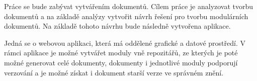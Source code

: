 Práce se bude zabývat vytvářením dokumentů. Cílem práce je analyzovat tvorbu dokumentů a na základě analýzy vytvořit návrh řešení pro tvorbu
modulárních dokumentů. Na základě tohoto návrhu bude následně vytvořena aplikace.

Jedná se o webovou aplikaci, která má oddělené grafické a datové prostředí.
V rámci aplikace je možné vytvářet moduly vně repozitářů, ze kterých je poté možné generovat celé dokumenty, dokumenty i jednotlivé moduly podporují verzování
a je možné získat i dokument starší verze ve správném znění.